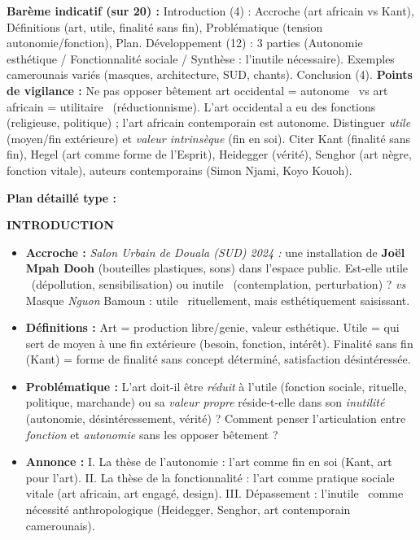 \documentclass[11pt]{article}
\begin{document}
\begin{corrige}
\textbf{Barème indicatif (sur 20) :} Introduction (4) : Accroche (art africain vs Kant), Définitions (art, utile, finalité sans fin), Problématique (tension autonomie/fonction), Plan. Développement (12) : 3 parties (Autonomie esthétique / Fonctionnalité sociale / Synthèse : l'inutile nécessaire). Exemples camerounais variés (masques, architecture, SUD, chants). Conclusion (4). \textbf{Points de vigilance :} Ne pas opposer bêtement \guillemotleft art occidental = autonome \guillemotright\ vs \guillemotleft art africain = utilitaire \guillemotright\ (réductionnisme). L'art occidental a eu des fonctions (religieuse, politique) ; l'art africain contemporain est autonome. Distinguer \emph{utile} (moyen/fin extérieure) et \emph{valeur intrinsèque} (fin en soi). Citer Kant (finalité sans fin), Hegel (art comme forme de l'Esprit), Heidegger (vérité), Senghor (art nègre, fonction vitale), auteurs contemporains (Simon Njami, Koyo Kouoh).

\textbf{Plan détaillé type :}

\textbf{INTRODUCTION}
\begin{itemize}
\item \textbf{Accroche :} \emph{Salon Urbain de Douala (SUD) 2024 :} une installation de \textbf{Joël Mpah Dooh} (bouteilles plastiques, sons) dans l'espace public. Est-elle \guillemotleft utile \guillemotright\ (dépollution, sensibilisation) ou \guillemotleft inutile \guillemotright\ (contemplation, perturbation) ? \emph{vs} Masque \emph{Nguon} Bamoun : \guillemotleft utile \guillemotright\ rituellement, mais esthétiquement saisissant.
\item \textbf{Définitions :} Art = production libre/genie, valeur esthétique. Utile = qui sert de moyen à une fin extérieure (besoin, fonction, intérêt). Finalité sans fin (Kant) = forme de finalité sans concept déterminé, satisfaction désintéressée.
\item \textbf{Problématique :} L'art doit-il être \emph{réduit} à l'utile (fonction sociale, rituelle, politique, marchande) ou sa \emph{valeur propre} réside-t-elle dans son \emph{inutilité} (autonomie, désintéressement, vérité) ? Comment penser l'articulation entre \emph{fonction} et \emph{autonomie} sans les opposer bêtement ?
\item \textbf{Annonce :} I. La thèse de l'autonomie : l'art comme fin en soi (Kant, art pour l'art). II. La thèse de la fonctionnalité : l'art comme pratique sociale vitale (art africain, art engagé, design). III. Dépassement : l'\guillemotleft inutile \guillemotright\ comme nécessité anthropologique (Heidegger, Senghor, art contemporain camerounais).
\end{itemize}


\end{corrige}
\end{document}
